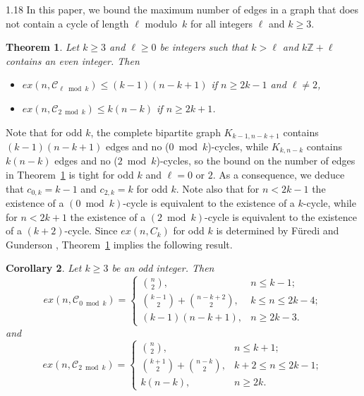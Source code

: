 \documentclass[10pt]{article}
\newtheorem{theorem}{Theorem}[section]
\newtheorem{corollary}[theorem]{Corollary}
\let\geq\geqslant
\begin{document}
\begin{spacing}{1.18}
In this paper, we bound the maximum number of edges in a graph that does not contain a cycle of length $\ell$ modulo~$k$ for all integers $\ell$ and $k\geqslant 3$. 

\begin{theorem}\label{thm: general bound}
    Let $k\geq 3$ and $\ell\geq 0$ be integers such that $k> \ell$ and $k\mathbb{Z}+\ell$ contains an even integer. Then
    \begin{itemize}
        \item [(1)] $ex(n,\mathcal{C}_{\ell\bmod k})\leqslant (k-1)(n-k+1)$ if $n \geq 2k-1$ and $\ell\neq 2$,
        \item [(2)] $ex(n,\mathcal{C}_{2\bmod k})\leqslant k(n-k)$ if $n \geq 2k+1$.
    \end{itemize}
\end{theorem}

Note that for odd $k$, the complete bipartite graph $K_{{k-1},{n-k+1}}$ contains $(k-1)(n-k+1)$ edges and no ($0\bmod k$)-cycles, while $K_{{k},{n-k}}$ contains $k(n-k)$ edges and no ($2\bmod k$)-cycles, so the bound on the number of edges in Theorem~\ref{thm: general bound} is tight for odd $k$ and $\ell = 0$ or $2$. As a consequence, we deduce that $c_{0,k}=k-1$ and $c_{2,k}=k$ for odd $k$. 
Note also that for $n<2k-1$ the existence of a $(0\bmod k)$-cycle is equivalent to the existence of a $k$-cycle, while for $n<2k+1$ the existence of a $(2\bmod k)$-cycle is equivalent to the existence of a $(k+2)$-cycle. Since $ex(n,C_k)$ for odd $k$ is determined by F\"uredi and Gunderson \cite{FG15}, Theorem~\ref{thm: general bound} implies the following result. 

\begin{corollary}\label{thm:c0k c2k}
    Let $k\geqslant 3$ be an odd integer. Then
    \[
    ex(n,\mathcal{C}_{0 \bmod k})= 
    \begin{cases}
      \binom{n}{2}, & n \leqslant k-1; \\
      \binom{k-1}{2}+\binom{n-k+2}{2}, &  k \leqslant n \leqslant 2k-4; \\
      (k-1)(n-k+1), & n\geqslant 2k-3.
    \end{cases}
    \]
and
    \[
    ex(n,\mathcal{C}_{2 \bmod k})= 
    \begin{cases}
      \binom{n}{2}, & n \leqslant k+1; \\
      \binom{k+1}{2}+\binom{n-k}{2}, &  k+2 \leqslant n \leqslant 2k-1; \\
      k(n-k), & n\geqslant 2k.
    \end{cases}
    \] 
\end{corollary}


\end{spacing}
\end{document}
